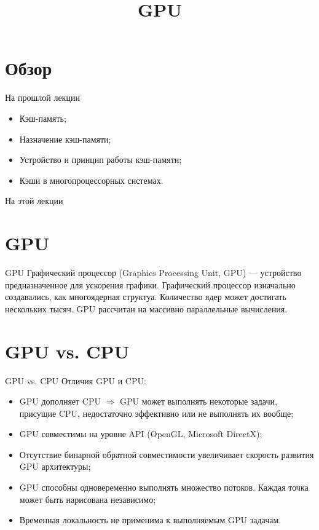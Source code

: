 

\title{GPU}



\begin{frame}
\titlepage
\end{frame}

\section*{Обзор}

\begin{frame}{На прошлой лекции}
\begin{itemize}
    \item Кэш-память;
    \item Назначение кэш-памяти;
    \item Устройство и принцип работы кэш-памяти;
    \item Кэши в многопроцессорных системах.
\end{itemize}
\end{frame}

\begin{frame}{На этой лекции}
\tableofcontents
\end{frame}

\section{GPU}

\begin{frame}{GPU}
Графический процессор (\abbr Graphics Processing Unit, GPU) --- устройство
предназначенное для ускорения графики.
\vfill
Графический процессор изначально создавались, как многоядерная структуа.
Количество ядер может достигать нескольких тысяч.
\vfill
GPU рассчитан на массивно параллельные вычисления.
\end{frame}

\section{GPU vs. CPU}

\begin{frame}{GPU vs. CPU}
Отличия GPU и CPU:
\begin{itemize}
    \item GPU дополняет CPU $\Rightarrow$ GPU может выполнять некоторые задачи,
    присущие CPU, недостаточно эффективно или не выполнять их вообще;\pause
    \item GPU совместимы на уровне API (OpenGL, Microsoft DirectX);\pause
    \item Отсутствие бинарной обратной совместимости увеличивает скорость
    развития GPU архитектуры;\pause
    \item GPU способны одновеременно выполнять множество потоков. Каждая точка
    может быть нарисована независимо;\pause
    \item Временная локальность не применима к выполняемым GPU задачам.
\end{itemize}
\end{frame}

